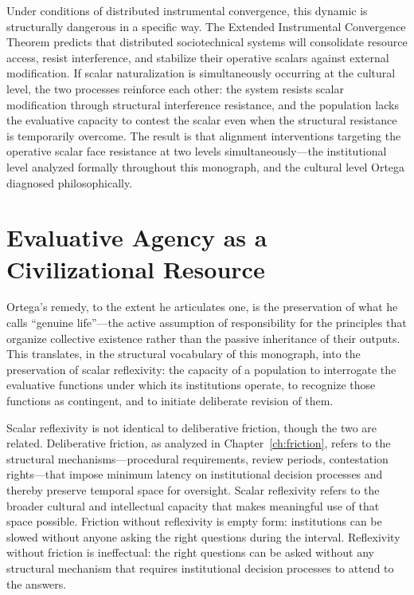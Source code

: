 \documentclass[12pt, oneside]{book}
\theoremstyle{plain}
\theoremstyle{definition}
\theoremstyle{remark}
\theoremstyle{definition}
\begin{document}
Under conditions of distributed instrumental convergence, this dynamic is structurally
dangerous in a specific way. The Extended Instrumental Convergence Theorem predicts
that distributed sociotechnical systems will consolidate resource access, resist
interference, and stabilize their operative scalars against external modification.
If scalar naturalization is simultaneously occurring at the cultural level, the two
processes reinforce each other: the system resists scalar modification through
structural interference resistance, and the population lacks the evaluative capacity
to contest the scalar even when the structural resistance is temporarily overcome.
The result is that alignment interventions targeting the operative scalar face
resistance at two levels simultaneously---the institutional level analyzed formally
throughout this monograph, and the cultural level Ortega diagnosed philosophically.

\section{Evaluative Agency as a Civilizational Resource}

Ortega's remedy, to the extent he articulates one, is the preservation of what he
calls ``genuine life''---the active assumption of responsibility for the principles
that organize collective existence rather than the passive inheritance of their
outputs. This translates, in the structural vocabulary of this monograph, into the
preservation of scalar reflexivity: the capacity of a population to interrogate the
evaluative functions under which its institutions operate, to recognize those
functions as contingent, and to initiate deliberate revision of them.

Scalar reflexivity is not identical to deliberative friction, though the two are
related. Deliberative friction, as analyzed in Chapter~\ref{ch:friction}, refers to
the structural mechanisms---procedural requirements, review periods, contestation
rights---that impose minimum latency on institutional decision processes and thereby
preserve temporal space for oversight. Scalar reflexivity refers to the broader
cultural and intellectual capacity that makes meaningful use of that space possible.
Friction without reflexivity is empty form: institutions can be slowed without
anyone asking the right questions during the interval. Reflexivity without friction
is ineffectual: the right questions can be asked without any structural mechanism
that requires institutional decision processes to attend to the answers.
\end{document}
